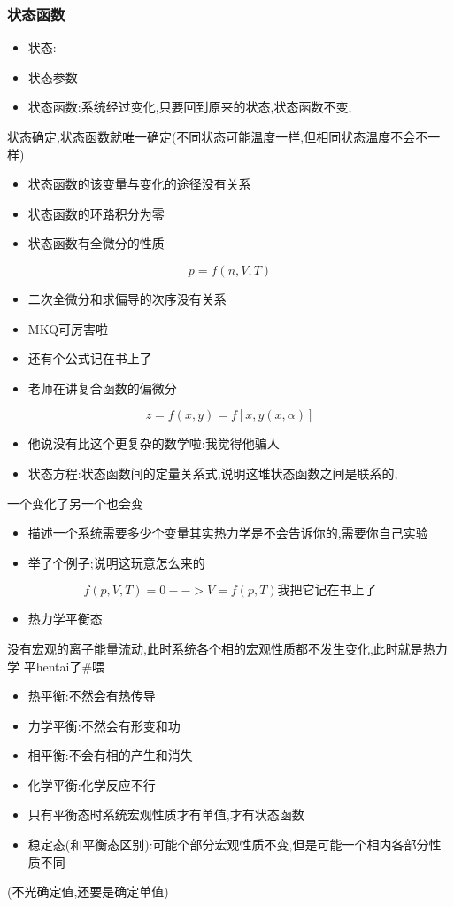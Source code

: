 \documentclass[11pt]{article}
\begin{document}
\subsubsection{状态函数}
\label{sec:org22cc58e}
\begin{itemize}
\item 状态:
\item 状态参数
\item 状态函数:系统经过变化,只要回到原来的状态,状态函数不变,
\end{itemize}
状态确定,状态函数就唯一确定(不同状态可能温度一样,但相同状态温度不会不一样)
\begin{itemize}
\item 状态函数的该变量与变化的途径没有关系
\item 状态函数的环路积分为零
\item 状态函数有全微分的性质
\end{itemize}
\[p=f(n,V,T)\]
\begin{itemize}
\item 二次全微分和求偏导的次序没有关系
\item MKQ可厉害啦
\item 还有个公式记在书上了
\item 老师在讲复合函数的偏微分
\end{itemize}
\[
z=f(x,y)=f[x,y(x,\alpha)]
\]
\begin{itemize}
\item 他说没有比这个更复杂的数学啦:我觉得他骗人
\end{itemize}
\begin{itemize}
\item 状态方程:状态函数间的定量关系式,说明这堆状态函数之间是联系的,
\end{itemize}
一个变化了另一个也会变
\begin{itemize}
\item 描述一个系统需要多少个变量其实热力学是不会告诉你的,需要你自己实验
\item 举了个例子;说明这玩意怎么来的
\end{itemize}
\[
f(p,V,T)=0 --> V=f(p,T)
我把它记在书上了
\]
\begin{itemize}
\item 热力学平衡态
\end{itemize}
没有宏观的离子能量流动,此时系统各个相的宏观性质都不发生变化,此时就是热力学
平hentai了\#喂
\begin{itemize}
\item 热平衡:不然会有热传导
\item 力学平衡:不然会有形变和功
\item 相平衡:不会有相的产生和消失
\item 化学平衡:化学反应不行
\end{itemize}
\begin{itemize}
\item 只有平衡态时系统宏观性质才有单值,才有状态函数
\item 稳定态(和平衡态区别):可能个部分宏观性质不变,但是可能一个相内各部分性质不同
\end{itemize}
(不光确定值,还要是确定单值)
\end{document}
